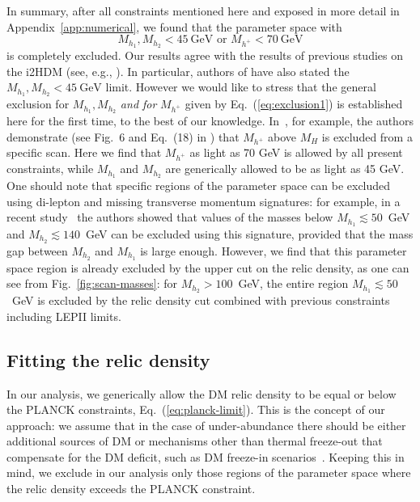 \documentclass[12pt,a4paper]{article}
\begin{document}
In summary, after all constraints mentioned here and exposed in more detail in Appendix~\ref{app:numerical},
we found that the parameter space with  
\begin{equation}
M_{h_1},M_{h_2}<45~\mbox{GeV} 
\mbox{\ or\ } M_{h^+}<70~\mbox{GeV} 
\label{eq:exclusion1}
\end{equation}
is completely excluded. Our results  agree with the results of previous studies on the i2HDM (see, e.g., \cite{Arhrib:2013ela,Ilnicka:2015jba}).
In particular, authors of \cite{Ilnicka:2015jba} have also stated 
the $M_{h_1},M_{h_2}<45~\mbox{GeV}$ limit.
However we would like to stress that the general exclusion 
for $M_{h_1},M_{h_2}$ {\it and for} $M_{h^+}$
given by Eq.~(\ref{eq:exclusion1}) is established here for the first time, to the best of our knowledge. In~\cite{Ilnicka:2015jba}, for example,  the authors demonstrate 
(see Fig.~6 and Eq.~(18) in \cite{Ilnicka:2015jba}) that 
$M_{h^+}$ above $M_H$ is excluded from a  specific scan. Here we find that
$M_{h^+}$ as light as 70 GeV  is allowed by all present constraints, while $M_{h_1}$ and
$M_{h_2}$ are generically allowed to be as light as 45 GeV. One should note that specific regions of the
parameter space can be excluded using di-lepton and missing transverse momentum
signatures: for example, in a recent study~\cite{Belanger:2015kga} the authors showed that values of the masses below
$M_{h_1}\lesssim 50$~GeV and  $M_{h_2}\lesssim 140$~GeV can be excluded using this signature,
provided that the mass gap between $M_{h_2}$ and $M_{h_1}$ is large enough. However, we find that this parameter
space region is already excluded by the upper cut on the relic density, as one can see
from Fig.~\ref{fig:scan-masses}: for  $M_{h_2}>100$~GeV, the entire region $M_{h_1}\lesssim
50$~GeV  is excluded by the relic density cut combined with previous constraints including LEPII limits.

\subsection{Fitting the relic density}

In our analysis, we generically allow the DM relic density to be equal or
below the PLANCK constraints, Eq.~(\ref{eq:planck-limit}).
This is the concept of our approach: we assume that in the case of under-abundance
there should be either additional sources of DM or mechanisms other than thermal freeze-out that 
compensate for the DM deficit, such as DM freeze-in scenarios~\cite{Hall:2009bx}.
Keeping this in mind, we exclude in our analysis only those regions of the parameter space 
where the relic density exceeds the PLANCK constraint.
\end{document}
